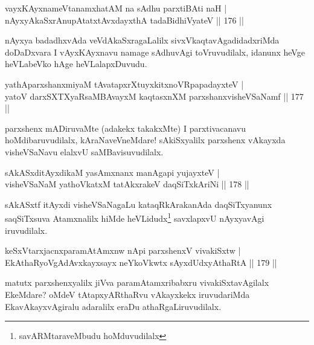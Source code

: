 
\begin{shl}
vayxKAyxnameVtanamxhatAM na sAdhu parxtiBAti naH |\\
nAyxyAkaSxrAnupAtatxtAvxdayxthA tadaBidhiVyateV \hfill || 176 ||
\end{shl}

\begin{artha}
nAyxya badadhxvAda veVdAkaSxragaLalilx sivxVkaqtavAgadidadxriMda doDaDxvara I vAyxKAyxnavu namage sAdhuvAgi toVruvudilalx, idanunx heVge heVLabeVko hAge heVLalapxDuvudu.
\end{artha}


\begin{shl}
yathAparxshanxmiyaM tAvatapxrXtuyxkitxnoVRpapadayxteV |\\
yatoV darxSXTXyaRsaMBAvayxM kaqtasxnXM parxshanxvisheVSaNamf \hfill || 177 ||
\end{shl}

\begin{artha}
parxshenx mADiruvaMte (adakekx takakxMte) I parxtivacanavu hoMdibaruvudilalx, kAraNaveVneMdare! sAkiSxyalilx parxshenx vAkayxda visheVSaNavu elalxvU saMBavisuvudilalx.
\end{artha}


\begin{shl}
sAkASxditAyxdikaM yasAmxnanx manAgapi yujayxteV |\\
visheVSaNaM yathoVkatxM tatAkxrakeV daqSiTxkAriNi \hfill || 178 ||
\end{shl}

\begin{artha}
sAkASxtf itAyxdi visheVSaNagaLu kataqRkArakanAda daqSiTxyanunx saqSiTxsuva Atamxnalilx hiMde heVLidudx\footnote[1]{savARMtaraveMbudu hoMduvudilalx} savxlapxvU nAyxyavAgi iruvudilalx.
\end{artha}

\begin{shl}
keSxVtarxjacnxparamAtAmxnw nApi parxshenxV vivakiSxtw |\\
EkAthaRyoVgAdAvxkayxsayx neYkoVkwtx sAyxdUdxyAthaRtA \hfill || 179 ||
\end{shl}

\begin{artha}%
matutx parxshenxyalilx jiVva paramAtamxribabxru vivakiSxtavAgilalx EkeMdare? oMdeV tAtapxyARthaRvu vAkayxkekx iruvudariMda EkavAkayxvAgiralu adaralilx eraDu athaRgaLiruvudilalx.
\end{artha}

